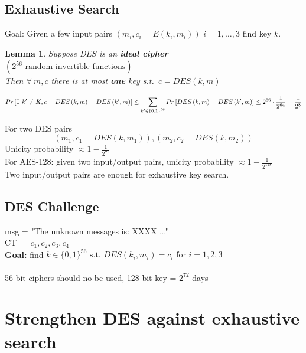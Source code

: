 \documentclass[a4paper]{article}
\newtheorem{lemma}[theorem]{Lemma}
\begin{document}
	\subsection{Exhaustive Search}
	Goal: Given a few input pairs $\left( m_i, c_i = E\left( k_i, m_i \right)  \right) $
	$i = 1,\ldots,3$ find key $k$.
	\pagebreak
	\begin{lemma}
		Suppose DES is an \textbf{ideal cipher}\\
		$\left( 2^{56} \text{ random invertible functions} \right)$\\
		Then  $\forall\ m,c$ there is at most \textbf{one} key s.t.\ 
		$c=DES\left( k,m \right) $
	\end{lemma}
	\begin{center}
		\[
			Pr\left[ \exists\ k' \neq K, c = DES\left( k,m \right)
			= DES\left( k',m \right)  \right] \le
			\sum_{k'\in \left\{ 0,1 \right\}^{56} }^{}
			Pr\left[ DES\left( k,m \right) =\\ 
			DES\left( k',m \right)  \right] \le 2^{56} \cdot 
			\frac{1}{2^{64}} = \frac{1}{2^{8}}
		\]
	\end{center}
	For two DES pairs
	\[
		\left( m_1,c_1=DES\left( k,m_1 \right)  \right),
		\left( m_2,c_2=DES\left( k,m_2 \right)  \right) 
	\]
	Unicity probability $\approx 1-\frac{1}{2^{71}}$\\
	For AES-128: given two input/output pairs, unicity probability
	$\approx 1-\frac{1}{2^{128}}$ \\
	Two input/output pairs are enough for exhaustive key search.

	
	\subsection{DES Challenge}
	msg = "The unknown messages is: XXXX \ldots"\\
	CT  $=c_1,c_2,c_3,c_4$\\
	\textbf{Goal:} find  $k \in \{0,1\}^{56} \text{ s.t.\ } DES\left( k_i,m_i \right) =c_i \text{ for } i=1,2,3$\\\\
	56-bit ciphers should no be used, 128-bit key = $2^{72}$ days
	
	\section{Strengthen DES against exhaustive search}
\end{document}
